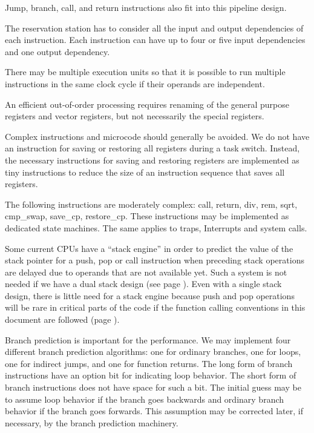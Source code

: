 \documentclass[forwardcom.tex]{subfiles}
\begin{document}
Jump, branch, call, and return instructions also fit into this pipeline design. 
\vspace{2mm}

The reservation station has to consider all the input and output dependencies of each instruction. Each instruction can have up to four or five input dependencies and one output dependency. 
\vspace{2mm}

There may be multiple execution units so that it is possible to run multiple instructions in the same clock cycle if their operands are independent. 
\vspace{2mm}

An efficient out-of-order processing requires renaming of the general purpose registers and vector registers, but not necessarily the special registers. 
\vspace{2mm}

Complex instructions and microcode should generally be avoided. We do not have an instruction for saving or restoring all registers during a task switch. Instead, the necessary instructions for saving and restoring registers are implemented as tiny instructions to reduce the size of an instruction sequence that saves all registers. 
\vspace{2mm}

The following instructions are moderately complex: call, return, div, rem, sqrt, cmp\_swap, save\_cp, restore\_cp. These instructions may be implemented as dedicated state machines. The same applies to traps, Interrupts and system calls. 
\vspace{2mm}

Some current CPUs have a ``stack engine'' in order to predict the value of the stack pointer for a push, pop or call instruction when preceding stack operations are delayed due to operands that are not available yet. Such a system is not needed if we have a dual stack design (see page \pageref{dualStack}). Even with a single stack design, there is little need for a stack engine because push and pop operations will be rare in critical parts of the code if the function calling conventions in this document are followed (page \pageref{functionCallingConventions}). 
\vspace{2mm}

Branch prediction is important for the performance. We may implement four different branch prediction algorithms: one for ordinary branches, one for loops, one for indirect jumps, and one for function returns. The long form of branch instructions have an option bit for indicating loop behavior. The short form of branch instructions does not have space for such a bit. The initial guess may be to assume loop behavior if the branch goes backwards and ordinary branch behavior if the branch goes forwards. This assumption may be corrected later, if necessary, by the branch prediction machinery. 
\vspace{2mm}
\end{document}
